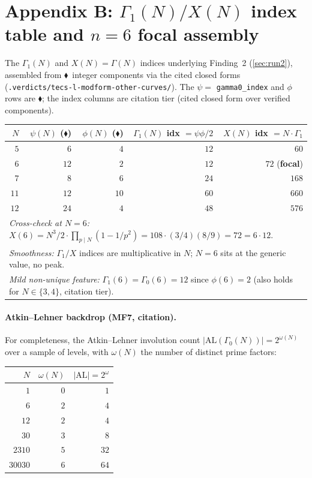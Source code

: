 \documentclass[11pt,a4paper]{article}
\newcommand{\tierF}{\textcolor{blue!60!black}{$\blacklozenge$}}   %
\newcommand{\Gz}{\Gamma_0}
\newcommand{\Go}{\Gamma_1}
\theoremstyle{definition}
\begin{document}
\section{Appendix B: $\Go(N)/X(N)$ index table and $n=6$ focal assembly}
\label{app:gamma1}

The $\Go(N)$ and $X(N)=\Gamma(N)$ indices underlying Finding~2
(\textsection\ref{sec:run2}), assembled from \tierF\ integer components via the
cited closed forms (\texttt{.verdicts/tecs-l-modform-other-curves/}). The
$\psi=$ \texttt{gamma0\_index} and $\phi$ rows are \tierF; the index columns are
citation tier (cited closed form over verified components).

\begin{center}
\begin{longtable}{rrrrr}
\toprule
$N$ & $\psi(N)$ (\tierF) & $\phi(N)$ (\tierF) & $\Go(N)$ idx $=\psi\phi/2$ & $X(N)$ idx $=N\cdot\Go$ \\
\midrule
\endhead
$5$  & $6$  & $4$  & $12$ & $60$  \\
$6$  & $12$ & $2$  & $12$ & $72$ \quad(\textbf{focal}) \\
$7$  & $8$  & $6$  & $24$ & $168$ \\
$11$ & $12$ & $10$ & $60$ & $660$ \\
$12$ & $24$ & $4$  & $48$ & $576$ \\
\midrule
\multicolumn{5}{l}{\emph{Cross-check at $N=6$:} $X(6) = N^3/2\cdot\prod_{p\mid N}(1-1/p^2)
  = 108\cdot(3/4)(8/9) = 72 = 6\cdot 12$.}\\
\multicolumn{5}{l}{\emph{Smoothness:} $\Go/X$ indices are multiplicative in $N$;
  $N=6$ sits at the generic value, no peak.}\\
\multicolumn{5}{l}{\emph{Mild non-unique feature:} $\Go(6)=\Gz(6)=12$ since
  $\phi(6)=2$ (also holds for $N\in\{3,4\}$, citation tier).}\\
\bottomrule
\end{longtable}
\end{center}

\paragraph{Atkin--Lehner backdrop (MF7, citation).} For completeness, the
Atkin--Lehner involution count $|\mathrm{AL}(\Gz(N))| = 2^{\omega(N)}$ over a
sample of levels, with $\omega(N)$ the number of distinct prime factors:
\begin{center}
\begin{tabular}{rrr}
\toprule
$N$ & $\omega(N)$ & $|\mathrm{AL}|=2^{\omega}$ \\
\midrule
$1$ & $0$ & $1$ \\
$6$ & $2$ & $4$ \\
$12$ & $2$ & $4$ \\
$30$ & $3$ & $8$ \\
$2310$ & $5$ & $32$ \\
$30030$ & $6$ & $64$ \\
\bottomrule
\end{tabular}
\end{center}
\end{document}
